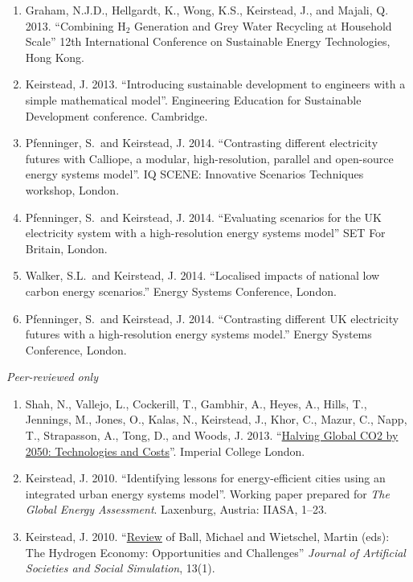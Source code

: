 \documentclass[11pt,a4paper]{article}
\newcommand{\marginhead}[1]{\marginpar{\textsf{{\footnotesize #1}}}}
\begin{document}
\begin{enumerate}
\item Graham, N.J.D., Hellgardt, K., Wong, K.S., Keirstead, J., and Majali, Q. 2013. ``Combining H$_2$ Generation and Grey Water Recycling at Household Scale'' 12th International Conference on Sustainable Energy Technologies, Hong Kong.

\item Keirstead, J. 2013. ``Introducing sustainable development to engineers with a simple mathematical model''.  Engineering Education for Sustainable Development conference.  Cambridge.

\item Pfenninger, S.\ and Keirstead, J. 2014. ``Contrasting different electricity futures with Calliope, a modular, high-resolution, parallel and open-source energy systems model''.  IQ SCENE: Innovative Scenarios Techniques workshop, London.

\item Pfenninger, S.\ and Keirstead, J. 2014. ``Evaluating scenarios for the UK electricity system with a high-resolution energy systems model'' SET For Britain, London.

\item Walker, S.L.\ and Keirstead, J. 2014. ``Localised impacts of national low carbon energy scenarios.''  Energy Systems Conference, London.

\item Pfenninger, S.\ and Keirstead, J. 2014. ``Contrasting different UK electricity futures with a high-resolution energy systems model.''  Energy Systems Conference, London.
\end{enumerate}

\bigskip

\noindent\marginhead{Reports and\\other writing}%
% 
\emph{Peer-reviewed only}
\medskip
\begin{enumerate}
\item Shah, N., Vallejo, L., Cockerill, T., Gambhir, A., Heyes, A., Hills, T., Jennings, M., Jones, O., Kalas, N., Keirstead, J., Khor, C., Mazur, C., Napp, T., Strapasson, A., Tong, D., and Woods, J. 2013. ``\href{http://www3.imperial.ac.uk/climatechange/publications/collaborative/halving-global-co2-by-2050}{Halving Global CO2 by 2050: Technologies and Costs}''.  Imperial College London.


\item Keirstead, J. 2010. ``Identifying lessons for energy-efficient cities using an integrated urban energy systems model''.  Working paper prepared for \emph{The Global Energy Assessment}.  Laxenburg, Austria: IIASA, 1--23.

\item Keirstead, J. 2010. ``\href{http://jasss.soc.surrey.ac.uk/13/1/reviews/keirstead.html}{Review} of Ball, Michael and Wietschel, Martin (eds): The Hydrogen Economy: Opportunities and Challenges'' \emph{Journal of Artificial Societies and Social Simulation}, 13(1).


\end{enumerate}
\end{document}
